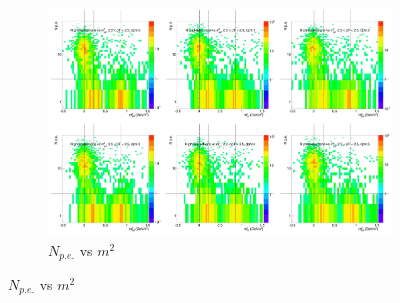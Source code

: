 \begin{figure}[H]
  \centering
    \begin{subfigure}{1\textwidth}
    \includegraphics[width=1\textwidth]{hiptfits/neg/PSaccthreshold_cent0_ich0_accfire0_ptbin9.jpg}
    \caption{$N_{p.e.}$ vs $m^2$}
    \end{subfigure}
\end{figure}
